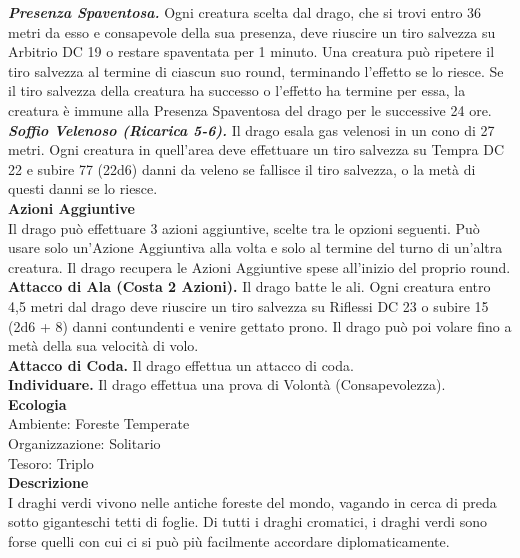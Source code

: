 \begin{multicols}{2}
\emph{\textbf{Presenza Spaventosa.}} Ogni creatura scelta dal drago, che si trovi entro 36 metri da esso e consapevole della sua presenza, deve riuscire un tiro salvezza su Arbitrio DC 19 o restare spaventata per 1 minuto. Una creatura può ripetere il tiro salvezza al termine di ciascun suo round, terminando l'effetto se lo riesce. Se il tiro salvezza della creatura ha successo o l'effetto ha termine per essa, la creatura è immune alla Presenza Spaventosa del drago per le successive 24 ore.\\
\emph{\textbf{Soffio Velenoso (Ricarica 5-6).}} Il drago esala gas velenosi in un cono di 27 metri. Ogni creatura in quell'area deve effettuare un tiro salvezza su Tempra DC 22 e subire 77 (22d6) danni da veleno se fallisce il tiro salvezza, o la metà di questi danni se lo riesce.\\
\textbf{Azioni Aggiuntive}\\
Il drago può effettuare 3 azioni aggiuntive, scelte tra le opzioni seguenti. Può usare solo un'Azione Aggiuntiva alla volta e solo al termine del turno di un'altra creatura. Il drago recupera le Azioni Aggiuntive spese all'inizio del proprio round.\\
\textbf{Attacco di Ala (Costa 2 Azioni).} Il drago batte le ali. Ogni creatura entro 4,5 metri dal  drago deve riuscire un tiro salvezza su Riflessi DC 23 o subire 15 (2d6 + 8) danni contundenti e venire gettato prono. Il drago può poi volare fino a metà della sua velocità di volo. \\
\textbf{Attacco di Coda.} Il drago effettua un attacco di coda.\\
\textbf{Individuare.} Il drago effettua una prova di Volontà (Consapevolezza).\\
\textbf{Ecologia}\\
Ambiente: Foreste Temperate\\
Organizzazione: Solitario\\
Tesoro: Triplo\\
\textbf{Descrizione}\\
I draghi verdi vivono nelle antiche foreste del mondo, vagando in cerca di preda sotto giganteschi tetti di foglie. Di tutti i draghi cromatici, i draghi verdi sono forse quelli con cui ci si può più facilmente accordare diplomaticamente.\\


\end{multicols}
